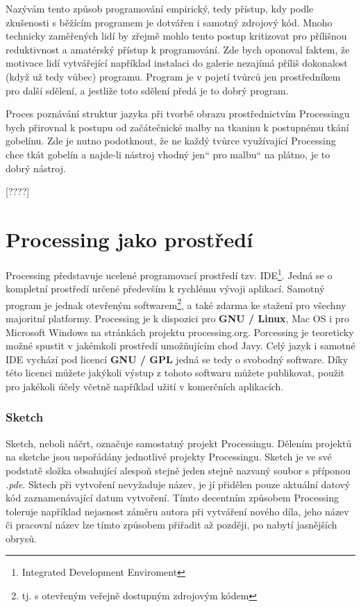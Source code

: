 \documentclass[12pt,twopage]{book}
\renewcommand\uv[1]{\quotedblbase #1\textquotedblleft}%
\newcommand{\pododdil}[1]{\subsection{#1}\label{subsec:#1}}
\newcommand{\slovnik}[1]{\textbf{\gls{#1}}\index{#1}}
\begin{document}
Nazývám tento způsob programování empirický, tedy přístup, kdy podle zkušenosti s běžícím programem je dotvářen i samotný zdrojový kód. Mnoho technicky zaměřených lidí by zřejmě mohlo tento postup kritizovat pro přílišnou reduktivnost a amatérský přístup k programování. Zde bych oponoval faktem, že motivace lidí vytvářející například instalaci do galerie nezajímá příliš dokonalost (když už tedy vůbec) programu. Program je v pojetí tvůrců jen prostředníkem pro další sdělení, a jestliže toto sdělení předá je to dobrý program.

Proces poznávání struktur jazyka při tvorbě obrazu prostřednictvím Processingu bych přirovnal k postupu od začátečnické malby na tkaninu k postupnému tkání gobelínu. Zde je nutno podotknout, že ne každý tvůrce využívající Processing chce tkát gobelín a najde-li nástroj vhodný \uv{jen} pro \uv{malbu} na plátno, je to dobrý nástroj.


[????]

\chapter{Processing jako prostředí}


Processing představuje ucelené programovací prostředí tzv. IDE\footnote{Integrated Development Enviroment}. Jedná se o kompletní prostředí určené především k rychlému vývoji aplikací. Samotný program je jednak otevřeným softwarem\footnote{tj. s otevřeným veřejně dostupným zdrojovým kódem}, a také zdarma ke stažení pro všechny majoritní platformy. Processing je k dispozici pro \slovnik{GNU / Linux}, Mac OS i pro Microsoft Windows na stránkách projektu processing.org. Porcessing je teoreticky možné spustit v jakémkoli prostředí umožňujícím chod Javy. Celý jazyk i samotné IDE vychází pod licencí \slovnik{GNU / GPL} jedná se tedy o svobodný software. Díky této licenci můžete jakýkoli výstup z tohoto softwaru můžete publikovat, použit pro jakékoli účely včetně například užití v komerčních aplikacích.


\pododdil{Sketch}

Sketch, neboli náčrt, označuje samostatný projekt Processingu. Dělením projektů na sketche jsou uspořádány jednotlivé projekty Processingu. Sketch je ve své podstatě složka obsahující alespoň stejně jeden stejně nazvaný soubor s příponou {\em *.pde}. Sktech při vytvoření nevyžaduje název, je jí přidělen pouze aktuální datový kód zaznamenávající datum vytvoření. Tímto decentním způsobem Processing toleruje například nejasnost záměru autora při vytváření nového díla, jeho název či pracovní název lze tímto způsobem přiřadit až později, po nabytí jasnějších obrysů.
\end{document}
